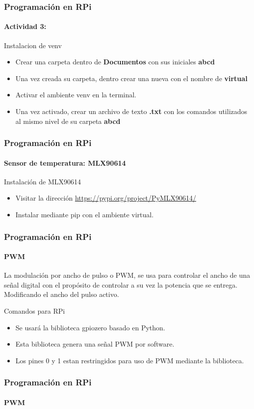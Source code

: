 \documentclass{beamer}
\begin{document}
		\begin{frame}
		\frametitle{Programación en RPi}
		\framesubtitle{Actividad 3:}
		\begin{mybox}{Instalacion de venv}
			\begin{itemize}
				\item Crear una carpeta dentro de \textbf{Documentos} con sus iniciales \textbf{abcd}
				\item Una vez creada su carpeta, dentro crear una nueva con el nombre de \textbf{virtual}
				\item Activar el ambiente venv en la terminal.
				\item Una vez activado, crear un archivo de texto \textbf{.txt} con los comandos utilizados al mismo nivel de su carpeta \textbf{abcd}
			\end{itemize}
		\end{mybox}
	\end{frame}
	
	\begin{frame}
		\frametitle{Programación en RPi}
		\framesubtitle{Sensor de temperatura: MLX90614}
		
		\begin{mybox}{Instalación de MLX90614}
			\begin{itemize}
				\item Visitar la dirección \url{https://pypi.org/project/PyMLX90614/}
				\item Instalar mediante pip con el ambiente virtual.
			\end{itemize}
		\end{mybox}
		
	\end{frame}
	
	
	
	\begin{frame}
		\frametitle{Programación en RPi}
		\framesubtitle{PWM}
		La modulación por ancho de pulso o PWM, se usa para controlar el ancho de una señal digital con el propósito de controlar a su vez la potencia que se entrega. Modificando el ancho del pulso activo.
		\begin{mybox}{Comandos para RPi}
			\begin{itemize}
				\item Se usará la biblioteca gpiozero basado en Python.
				\item Esta biblioteca genera una señal PWM por software.
				\item Los pines 0 y 1 estan restringidos para uso de PWM mediante la biblioteca.
			\end{itemize}
		\end{mybox}
	\end{frame}
	\begin{frame}
		\frametitle{Programación en RPi}
		\framesubtitle{PWM}
	\end{frame}
\end{document}
